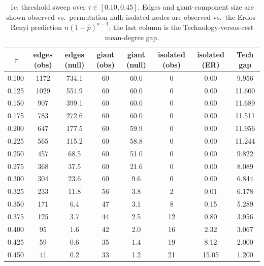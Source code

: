 \documentclass[11pt]{article}
\begin{document}
\begin{table}[htbp]
    \centering
    \caption{1c: threshold sweep over $\tau \in [0.10, 0.45]$. Edges and giant-component size are
    shown observed vs.\ permutation null; isolated nodes are observed vs.\ the Erdos-Renyi prediction
    $n(1-\hat p)^{n-1}$; the last column is the Technology-versus-rest mean-degree gap.}
    \label{tab:sweep}
    \footnotesize
    \begin{tabular*}{\textwidth}{@{\extracolsep{\fill}}cccccccc@{}}
        \toprule
        $\tau$ & edges (obs) & edges (null) & giant (obs) & giant (null) & isolated (obs) & isolated (ER) & Tech gap \\
        \midrule
        0.100 & 1172 & 734.1 & 60 & 60.0 & 0 & 0.00 & 9.956 \\
        0.125 & 1029 & 554.9 & 60 & 60.0 & 0 & 0.00 & 11.600 \\
        0.150 & 907  & 399.1 & 60 & 60.0 & 0 & 0.00 & 11.689 \\
        0.175 & 783  & 272.6 & 60 & 60.0 & 0 & 0.00 & 11.511 \\
        0.200 & 647  & 177.5 & 60 & 59.9 & 0 & 0.00 & 11.956 \\
        0.225 & 565  & 115.2 & 60 & 58.8 & 0 & 0.00 & 11.244 \\
        0.250 & 457  & 68.5  & 60 & 51.0 & 0 & 0.00 & 9.822  \\
        0.275 & 368  & 37.5  & 60 & 21.6 & 0 & 0.00 & 8.089  \\
        0.300 & 304  & 23.6  & 60 & 9.6  & 0 & 0.00 & 6.844  \\
        0.325 & 233  & 11.8  & 56 & 3.8  & 2 & 0.01 & 6.178  \\
        0.350 & 171  & 6.4   & 47 & 3.1  & 8 & 0.15 & 5.289  \\
        0.375 & 125  & 3.7   & 44 & 2.5  & 12 & 0.80 & 3.956 \\
        0.400 & 95   & 1.6   & 42 & 2.0  & 16 & 2.32 & 3.067 \\
        0.425 & 59   & 0.6   & 35 & 1.4  & 19 & 8.12 & 2.000 \\
        0.450 & 41   & 0.2   & 33 & 1.2  & 21 & 15.05 & 1.200 \\
        \bottomrule
    \end{tabular*}
\end{table}
\end{document}
